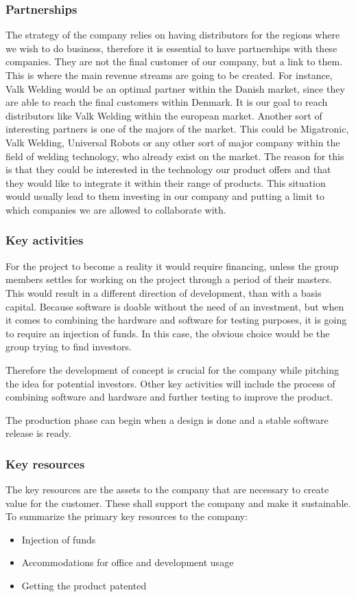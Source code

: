 \subsubsection{Partnerships}
The strategy of the company relies on having distributors for the regions where we wish to do business, therefore it is essential to have partnerships with these companies. They are not the final customer of our company, but a link to them. This is where the main revenue streams are going to be created.
For instance, Valk Welding would be an optimal partner within the Danish market, since they are able to reach the final customers within Denmark. It is our goal to reach distributors like Valk Welding within the european market.
Another sort of interesting partners is one of the majors of the market. This could be Migatronic, Valk Welding, Universal Robots or any other sort of major company within the field of welding technology, who already exist on the market. The reason for this is that they could be interested in the technology our product offers and that they would like to integrate it within their range of products. This situation would usually lead to them investing in our company and putting a limit to which companies we are allowed to collaborate with.

\subsubsection{Key activities}
For the project to become a reality it would require financing, unless the group members settles for working on the project through a period of their masters. This would result in a different direction of development, than with a basis capital. Because software is doable without the need of an investment, but when it comes to combining the hardware and software for testing purposes, it is going to require an injection of funds. In this case, the obvious choice would be the group trying to find investors.

Therefore the development of concept is crucial for the company while pitching the idea for potential investors. Other key activities will include the process of combining software and hardware and further testing to improve the product. 

The production phase can begin when a design is done and a stable software release is ready. 

\subsubsection{Key resources}
The key resources are the assets to the company that are necessary to create value for the customer. These shall support the company and make it sustainable.
To summarize the primary key resources to the company:
\begin{itemize}
\item Injection of funds
\item Accommodations for office and development usage
\item Getting the product patented
\end{itemize}
